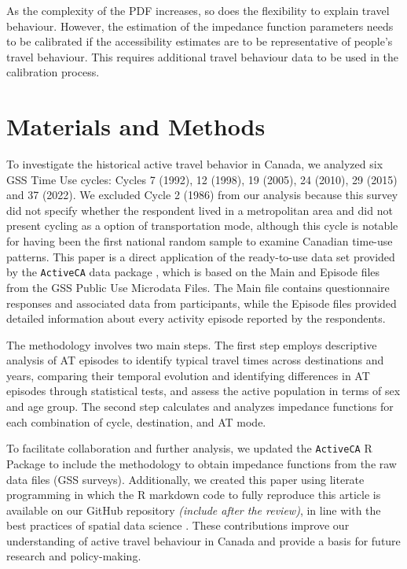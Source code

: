 \documentclass[preprint, 3p,
authoryear]{elsarticle} %
\begin{document}
As the complexity of the PDF increases, so does the flexibility to
explain travel behaviour. However, the estimation of the impedance
function parameters needs to be calibrated if the accessibility
estimates are to be representative of people's travel behaviour. This
requires additional travel behaviour data to be used in the calibration
process.

\section{Materials and Methods}\label{materials-and-methods}

To investigate the historical active travel behavior in Canada, we
analyzed six GSS Time Use cycles: Cycles 7 (1992), 12 (1998), 19 (2005),
24 (2010), 29 (2015) and 37 (2022). We excluded Cycle 2 (1986) from our
analysis because this survey did not specify whether the respondent
lived in a metropolitan area and did not present cycling as a option of
transportation mode, although this cycle is notable for having been the
first national random sample to examine Canadian time-use patterns. This
paper is a direct application of the ready-to-use data set provided by
the \texttt{ActiveCA} data package \citep{dossantos2025}, which is based
on the Main and Episode files from the GSS Public Use Microdata Files.
The Main file contains questionnaire responses and associated data from
participants, while the Episode files provided detailed information
about every activity episode reported by the respondents.

The methodology involves two main steps. The first step employs
descriptive analysis of AT episodes to identify typical travel times
across destinations and years, comparing their temporal evolution and
identifying differences in AT episodes through statistical tests, and
assess the active population in terms of sex and age group. The second
step calculates and analyzes impedance functions for each combination of
cycle, destination, and AT mode.

To facilitate collaboration and further analysis, we updated the
\texttt{ActiveCA} R Package to include the methodology to obtain
impedance functions from the raw data files (GSS surveys). Additionally,
we created this paper using literate programming in which the R markdown
code to fully reproduce this article is available on our GitHub
repository \emph{(include after the review)}, in line with the best
practices of spatial data science \citep{arribas-bel2021, paez2021}.
These contributions improve our understanding of active travel behaviour
in Canada and provide a basis for future research and policy-making.
\end{document}
